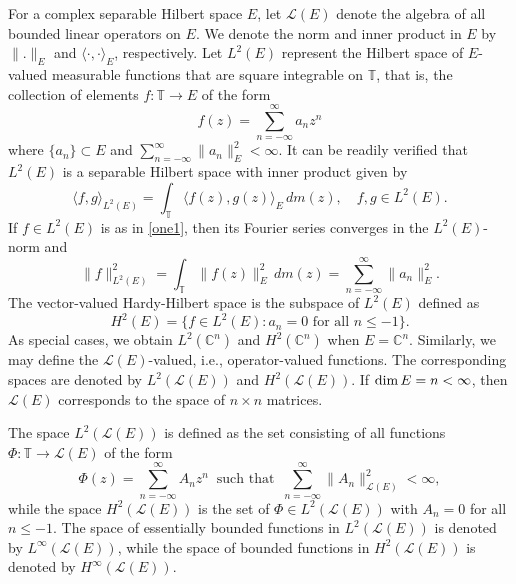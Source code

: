 \documentclass{amsart}
\theoremstyle{definition}
\def\LL{{\mathcal L}}
\begin{document}
 For a complex separable Hilbert space $E$, let  $\mathcal{L}(E)$ denote the algebra of all bounded linear operators on $E$. We denote the norm and inner product in $E$ by $\|.\|_{E}$ and $\langle \cdot, \cdot \rangle_{E}$, respectively. Let $L^{2}(E)$ represent the Hilbert space of $E$-valued measurable functions that are square integrable on $\mathbb{T}$, that is, the collection of elements $f:\mathbb{T}\to E$ of the form
\begin{equation}\label{one1}
 f(z)=\sum\limits_{n=-\infty}^{\infty}a_{n}z^n\end{equation} 
 where $\{a_{n}\}\subset E$ and $\sum\limits_{n=-\infty}^{\infty}\|a_{n}\|_{E}^{2}<\infty.$
It can be readily verified that $L^{2}(E)$ is a separable Hilbert space with inner product given by
\begin{equation*}
\langle f,g\rangle_{L^{2}(E)}=\int_{\mathbb{T}}\langle f(z),g(z)\rangle_{E}\,dm(z),\quad f,g\in L^2(E).
\end{equation*}
If $f\in L^2(E)$ is as in %
 \eqref{one1}, then its Fourier series converges in the $L^2(E)$-norm and
$$\|f\|_{L^2(E)}^2=\int_{\mathbb{T}} \| f(z)\|_{E}^2\,dm(z)=\sum\limits_{n=-\infty}^{\infty}\|a_{n}\|_{E}^{2}.$$
The vector-valued Hardy-Hilbert space %
is the %
 subspace of $L^2(E)$ defined as
$$H^{2}(E)={\{f\in L^{2}(E): a_{n}=0 \text{ for all }  n\leq -1}\}.$$ 
As special cases, we obtain $L^{2}(\mathbb{C}^{n})$ and $H^{2}(\mathbb{C}^{n})$ when $E=\mathbb{C}^{n}$. %
 Similarly, we may %
  define the $\mathcal{L}(E)$-valued, i.e., operator-valued functions. The corresponding spaces are denoted by $L^{2}(\mathcal{L}(E))$ and $H^{2}(\mathcal{L}(E))$. If $\text{dim\,} E=n<\infty$, then $\mathcal{L}(E)$ corresponds to the space of $n\times n$ matrices.

\medskip


The space $L^{2}(\LL(E))$ is defined as the set consisting of all functions $\Phi:\mathbb{T}\to \LL(E)$ of the form 
$$\Phi(z)=\sum\limits_{n=-\infty}^{\infty}A_{n}z^n \ \text{ such that }\ \sum\limits_{n=-\infty}^{\infty}\|A_{n}\|_{\LL(E)}^{2}<\infty,$$
while %
 the space $H^{2}(\LL(E))$ is the set of $\Phi\in L^{2}(\LL(E))$ with $A_{n}=0$ for all $n\leq -1$.
The space of essentially bounded functions in $L^{2}(\LL(E))$ is denoted by $L^{\infty}(\LL(E))$, while the space of bounded functions in $H^{2}(\LL(E))$ is denoted by $H^{\infty}(\LL(E))$.
\end{document}
